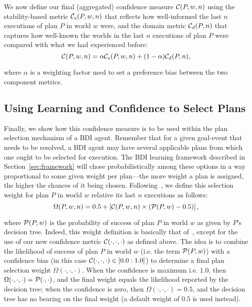 We now define our final (aggregated) confidence measure $\C(P,w,n)$ using the stability-based metric $\C_s(P,w,n)$ that reflects how well-informed the last $n$ executions of plan $P$ in world $w$ were, and the domain metric $\C_d(P,n)$ that captures how well-known the worlds in the last $n$ executions of plan $P$ were compared with what we had experienced before:
\[
	\C(P,w,n) = \alpha\C_s(P,w,n) + (1-\alpha)\C_d(P,n),
\label{eqn:confidence}
\]

\noindent
where $\alpha$ is a weighting factor used to set a preference bias between the two component metrics.

\subsection{Using Learning and Confidence to Select Plans}\label{sec:selection}

Finally, we show how this confidence measure is to be used within the plan selection mechanism of a BDI agent. Remember that for a given goal-event that needs to be resolved, a BDI agent may have several applicable plans from which one ought to be selected for execution. The BDI learning framework described in Section~\ref{sec:framework} will chose probabilistically among these options in a way proportional to some given weight per plan---the more weight a plan is assigned, the higher the chances of it being chosen. 
Following~\cite{singh10:extending,singh10:learning}, we define this selection weight for plan $P$ in world $w$ relative its last $n$ executions as follows: 
\[
	\Omega(P,w,n) = 0.5 + \left[  \C(P,w,n) \times  \left( \P(P,w) - 0.5 \right)  \right],
\label{eqn:omega}   
\]

\noindent 
where $\P(P,w)$ is the probability of success of plan $P$ in world $w$ as given by $P$'s decision tree. 
%
Indeed, this weight definition is basically that of~\cite{singh10:extending,singh10:learning}, except for the use of our new confidence metric $\C(\cdot,\cdot,\cdot)$ as defined above. The idea is to combine the likelihood of success of plan $P$ in world $w$ (i.e. the term $\P(P,w)$) with a confidence bias (in this case $\C(\cdot,\cdot,\cdot) \in [0.0:1.0]$) to determine a final plan selection weight $\Omega(\cdot,\cdot,\cdot)$. 
When the confidence is maximum i.e. $1.0$, then $\Omega(\cdot,\cdot,\cdot) = \P(\cdot,\cdot)$, and the final weight equals the likelihood reported by the decision tree; when the confidence is zero, then $\Omega(\cdot,\cdot,\cdot)=0.5$, and the decision tree has no bearing on the final weight (a default weight of $0.5$ is used instead).

